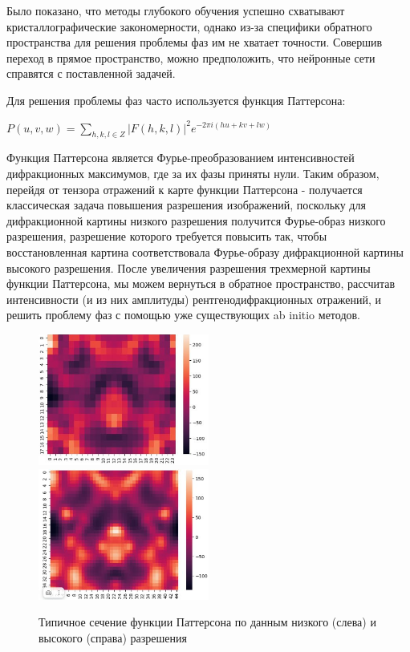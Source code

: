 Было показано, что методы глубокого обучения успешно схватывают кристаллографические закономерности, однако из-за специфики обратного пространства для решения проблемы фаз им не хватает точности. Совершив переход в прямое пространство, можно предположить, что нейронные сети справятся с поставленной задачей.

Для решения проблемы фаз часто используется функция Паттерсона:

\begin{center}
    $P(u, v, w) = \sum\limits_{h,k,l\in Z} |F(h,k,l)|^2e^{-2\pi i(hu+kv+lw)}$
\end{center}

Функция Паттерсона является Фурье-преобразованием интенсивностей дифракционных максимумов, где за их фазы приняты нули. Таким образом, перейдя от тензора отражений к карте функции Паттерсона - получается классическая задача повышения разрешения изображений, поскольку для дифракционной картины низкого разрешения получится Фурье-образ низкого разрешения, разрешение которого требуется повысить так, чтобы восстановленная картина соответствовала Фурье-образу дифракционной картины высокого разрешения. После увеличения разрешения трехмерной картины функции Паттерсона, мы можем вернуться в обратное пространство, рассчитав интенсивности (и из них амплитуды) рентгенодифракционных отражений, и решить проблему фаз с помощью уже существующих ab initio методов.

\begin{figure}[H]
    \centering
    \includegraphics[width=0.5\textwidth]{figures/patt_high.png}\hfill
    \includegraphics[width=0.5\textwidth]{figures/patt_low.png}
    \caption{Типичное сечение функции Паттерсона по данным низкого (слева) и высокого (справа) разрешения}
    \label{patt}
\end{figure}